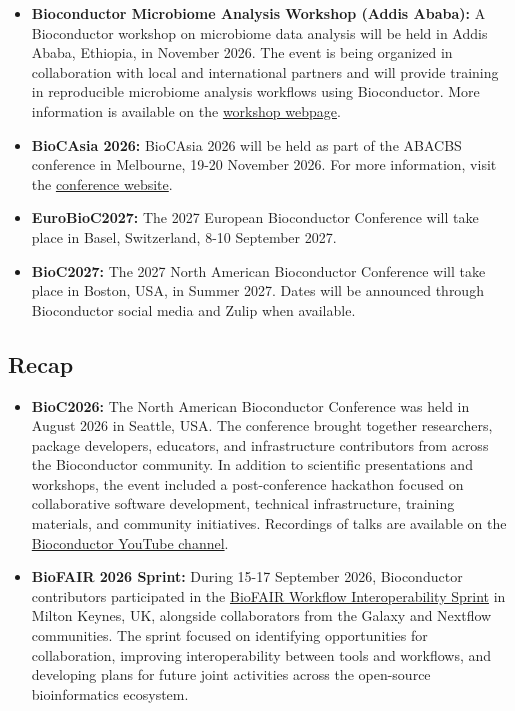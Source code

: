 \begin{itemize}
\tightlist
\item
  \textbf{Bioconductor Microbiome Analysis Workshop (Addis Ababa):} A Bioconductor workshop on microbiome data analysis will be held in Addis Ababa, Ethiopia, in November 2026. The event is being organized in collaboration with local and international partners and will provide training in reproducible microbiome analysis workflows using Bioconductor. More information is available on the \href{https://training.bioconductor.org/workshops/2026-11-Addis-Ababa/index.html}{workshop webpage}.
\item
  \textbf{BioCAsia 2026:} BioCAsia 2026 will be held as part of the ABACBS conference in Melbourne, 19-20 November 2026. For more information, visit the \href{https://biocasia2026.bioconductor.org/}{conference website}.
\item
  \textbf{EuroBioC2027:} The 2027 European Bioconductor Conference will take place in Basel, Switzerland, 8-10 September 2027.
\item
  \textbf{BioC2027:} The 2027 North American Bioconductor Conference will take place in Boston, USA, in Summer 2027. Dates will be announced through Bioconductor social media and Zulip when available.
\end{itemize}

\subsection{Recap}\label{recap}

\begin{itemize}
\item
  \textbf{BioC2026:} The North American Bioconductor Conference was held in August 2026 in Seattle, USA. The conference brought together researchers, package developers, educators, and infrastructure contributors from across the Bioconductor community. In addition to scientific presentations and workshops, the event included a post-conference hackathon focused on collaborative software development, technical infrastructure, training materials, and community initiatives. Recordings of talks are available on the \href{https://www.youtube.com/watch?v=gRHf8m3fn7Y&list=PLMYePXTcNLQo}{Bioconductor YouTube channel}.
\item
  \textbf{BioFAIR 2026 Sprint:} During 15-17 September 2026, Bioconductor contributors participated in the \href{https://github.com/BiocCodingCollaborations/BioFAIR2026_Sprint}{BioFAIR Workflow Interoperability Sprint} in Milton Keynes, UK, alongside collaborators from the Galaxy and Nextflow communities. The sprint focused on identifying opportunities for collaboration, improving interoperability between tools and workflows, and developing plans for future joint activities across the open-source bioinformatics ecosystem.
\end{itemize}


